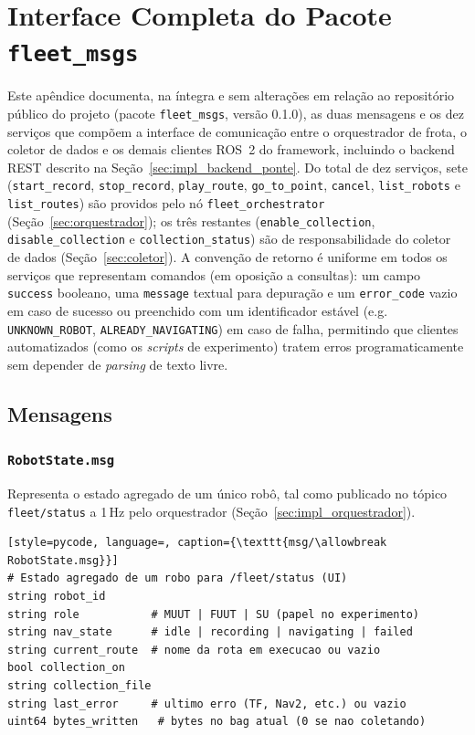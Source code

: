 \chapter{Interface Completa do Pacote \texttt{fleet\_\allowbreak msgs}}
\label{ap:fleet_msgs}

Este apêndice documenta, na íntegra e sem alterações em relação ao repositório
público do projeto (pacote \texttt{fleet\_\allowbreak msgs}, versão 0.1.0), as duas mensagens
e os dez serviços que compõem a interface de comunicação entre o orquestrador de
frota, o coletor de dados e os demais clientes ROS~2 do framework, incluindo o
backend REST descrito na Seção~\ref{sec:impl_backend_ponte}. Do total de dez
serviços, sete (\texttt{start\_\allowbreak record}, \texttt{stop\_\allowbreak record}, \texttt{play\_\allowbreak route},
\texttt{go\_\allowbreak to\_\allowbreak point}, \texttt{cancel}, \texttt{list\_\allowbreak robots} e \texttt{list\_\allowbreak routes})
são providos pelo nó \texttt{fleet\_\allowbreak orchestrator} (Seção~\ref{sec:orquestrador});
os três restantes (\texttt{enable\_\allowbreak collection}, \texttt{disable\_\allowbreak collection} e
\texttt{collection\_\allowbreak status}) são de responsabilidade do coletor de dados
(Seção~\ref{sec:coletor}). A convenção de retorno é uniforme em todos os serviços
que representam comandos (em oposição a consultas): um campo \texttt{success}
booleano, uma \texttt{message} textual para depuração e um \texttt{error\_\allowbreak code}
vazio em caso de sucesso ou preenchido com um identificador estável (e.g.
\texttt{UNKNOWN\_\allowbreak ROBOT}, \texttt{ALREADY\_\allowbreak NAVIGATING}) em caso de falha, permitindo
que clientes automatizados (como os \textit{scripts} de experimento) tratem erros
programaticamente sem depender de \textit{parsing} de texto livre.

\section{Mensagens}

\subsection{\texttt{RobotState.msg}}

Representa o estado agregado de um único robô, tal como publicado no tópico
\texttt{fleet/\allowbreak status} a 1\,Hz pelo orquestrador (Seção~\ref{sec:impl_orquestrador}).

\begin{lstlisting}[style=pycode, language=, caption={\texttt{msg/\allowbreak RobotState.msg}}]
# Estado agregado de um robo para /fleet/status (UI)
string robot_id
string role           # MUUT | FUUT | SU (papel no experimento)
string nav_state      # idle | recording | navigating | failed
string current_route  # nome da rota em execucao ou vazio
bool collection_on
string collection_file
string last_error     # ultimo erro (TF, Nav2, etc.) ou vazio
uint64 bytes_written   # bytes no bag atual (0 se nao coletando)
\end{lstlisting}


